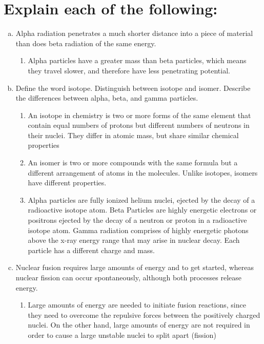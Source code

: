 \documentclass[11pt]{article}
\begin{document}
\section{Explain each of the following:}
\label{sec:orga9979ae}
\begin{enumerate}[(a)]
\item Alpha radiation penetrates a much shorter distance into a piece of material than does beta radiation of the same energy.
\begin{enumerate}
\item Alpha particles have a greater mass than beta particles, which means
they travel slower, and therefore have less penetrating potential.
\end{enumerate}

\item Define the word isotope. Distinguish between isotope and isomer. Describe the differences between alpha, beta, and gamma particles.
\begin{enumerate}
\item An isotope in chemistry is two or more forms of the same element that contain equal numbers of protons but different numbers of neutrons in their nuclei. They differ in atomic mass, but share similar chemical properties
\item An isomer is two or more compounds with the same formula but a different arrangement of atoms in the molecules. Unlike isotopes, isomers have different properties.
\item Alpha particles are fully ionized helium nuclei, ejected by the decay
of a radioactive isotope atom. Beta Particles are highly energetic
electrons or positrons ejected by the decay of a neutron or proton in
a radioactive isotope atom. Gamma radiation comprises of highly
energetic photons above the x-ray energy range that may arise in
nuclear decay. Each particle has a different charge and mass.
\end{enumerate}

\item Nuclear fusion requires large amounts of energy and to get started,
whereas nuclear fission can occur spontaneously, although both processes
release energy.
\begin{enumerate}
\item Large amounts of energy are needed to initiate fusion reactions, since
they need to overcome the repulsive forces between the positively
charged nuclei. On the other hand, large amounts of energy are not
required in order to cause a large unstable nuclei to split apart (fission)
\end{enumerate}


\end{enumerate}
\end{document}
